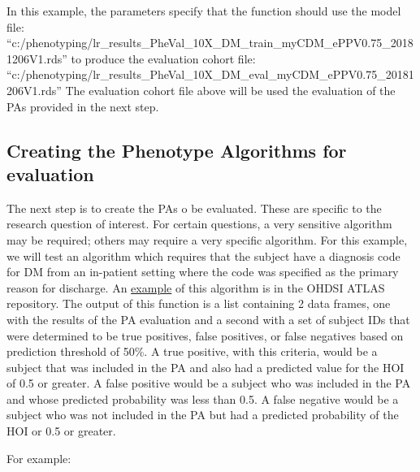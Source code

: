 \documentclass[]{article}
\begin{document}
In this example, the parameters specify that the function should use the
model file:
``c:/phenotyping/lr\_results\_PheVal\_10X\_DM\_train\_myCDM\_ePPV0.75\_20181206V1.rds''
to produce the evaluation cohort file:
``c:/phenotyping/lr\_results\_PheVal\_10X\_DM\_eval\_myCDM\_ePPV0.75\_20181206V1.rds''
The evaluation cohort file above will be used the evaluation of the PAs
provided in the next step.

\hypertarget{creating-the-phenotype-algorithms-for-evaluation}{%
\subsection{Creating the Phenotype Algorithms for
evaluation}\label{creating-the-phenotype-algorithms-for-evaluation}}

The next step is to create the PAs o be evaluated. These are specific to
the research question of interest. For certain questions, a very
sensitive algorithm may be required; others may require a very specific
algorithm. For this example, we will test an algorithm which requires
that the subject have a diagnosis code for DM from an in-patient setting
where the code was specified as the primary reason for discharge. An
\href{http://www.ohdsi.org/web/atlas/\#/cohortdefinition/1769702}{example}
of this algorithm is in the OHDSI ATLAS repository. The output of this
function is a list containing 2 data frames, one with the results of the
PA evaluation and a second with a set of subject IDs that were
determined to be true positives, false positives, or false negatives
based on prediction threshold of 50\%. A true positive, with this
criteria, would be a subject that was included in the PA and also had a
predicted value for the HOI of 0.5 or greater. A false positive would be
a subject who was included in the PA and whose predicted probability was
less than 0.5. A false negative would be a subject who was not included
in the PA but had a predicted probability of the HOI or 0.5 or greater.

For example:
\end{document}
